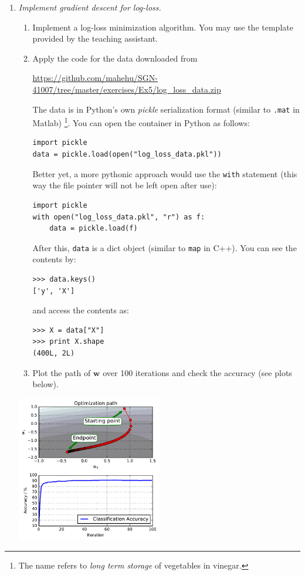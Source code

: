 \documentclass[a4paper,12pt]{scrartcl}
\newcommand{\w}{\mathbf{ w}}
\newcommand{\python}{{\fbox{\texttt{\bfseries python}}\quad}}
\begin{document}
\begin{enumerate}
\item \python \emph{Implement gradient descent for log-loss.}

\begin{enumerate}
\item Implement a log-loss minimization algorithm. You may use the template provided by the
teaching assistant.
\item Apply the code for the data downloaded from

\url{https://github.com/mahehu/SGN-41007/tree/master/exercises/Ex5/log_loss_data.zip}

The data is in Python's own \emph{pickle} serialization format (similar to \texttt{.mat} in Matlab)%
\footnote{The name refers to \emph{long term storage} of vegetables in vinegar.}. 
You can open the container in Python as follows:
\begin{verbatim}
import pickle
data = pickle.load(open("log_loss_data.pkl"))
\end{verbatim}
Better yet, a more pythonic approach would use the \verb+with+ statement (this way the file
pointer will not be left open after use):
\begin{verbatim}
import pickle
with open("log_loss_data.pkl", "r") as f:
    data = pickle.load(f)
\end{verbatim}

After this, \verb+data+ is a dict object (similar to \verb+map+ in C++).
You can see the contents by:
\begin{verbatim}
>>> data.keys()
['y', 'X']
\end{verbatim}
and access the contents as:
\begin{verbatim}
>>> X = data["X"]
>>> print X.shape
(400L, 2L)
\end{verbatim}

\item Plot the path of $\w$ over 100 iterations and check the accuracy (see plots below).

\end{enumerate}

\centerline{\includegraphics[width=0.5\textwidth]{log_loss_minimization.pdf}}


\end{enumerate}
\end{document}
